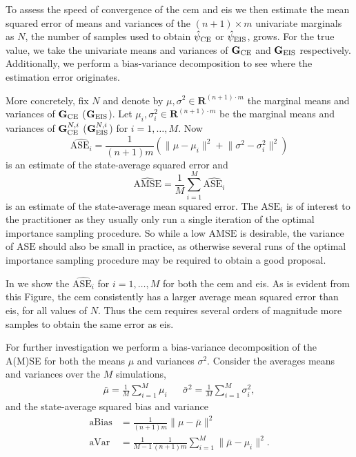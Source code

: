 To assess the speed of convergence of the \gls{cem} and \gls{eis} we then estimate the mean squared error of means and variances of the $(n+1) \times m$ univariate marginals as $N$, the number of samples used to obtain ${\hat\psi_{\text{CE}}}$ or ${\hat\psi_{\text{EIS}}}$, grows. For the true value, we take the univariate means and variances of $\mathbf G_{{\text{CE}}}$ and $\mathbf G_{{\text{EIS}}}$ respectively. Additionally, we perform a bias-variance decomposition to see where the estimation error originates. 

More concretely, fix $N$ and denote by $\mu, \sigma^{2} \in \mathbf R^{(n + 1) \cdot m}$ the marginal means and variances of $\mathbf G_{{\text{CE}}}$ ($\mathbf G_{{\text{EIS}}}$). 
Let $\mu_{i}, \sigma^{2}_{i}\in\mathbf R^{(n + 1) \cdot m}$ be the marginal means and variances of $\mathbf G^{N,i}_{{\text{CE}}}$ ($\mathbf G^{N,i}_{{\text{EIS}}}$) for $i = 1,\dots, M$. 
Now 
$$
\widehat{\text{ASE}_{i}} = \frac{1}{(n +1)m} \left( \lVert \mu - \mu_{i}\rVert^{2} + \lVert \sigma^{2} - \sigma^{2}_{i}\rVert^{2} \right)
$$
is an estimate of the state-average squared error and 
$$
\widehat{\text{AMSE}} = \frac{1}{M} \sum_{i = 1}^{M} \widehat{\text{ASE}_{i}}
$$
is an estimate of the state-average mean squared error. 
The $\text{ASE}_{i}$ is of interest to the practitioner as they usually only run a single iteration of the optimal importance sampling procedure. So while a low $\text{AMSE}$ is desirable, the variance of $\text{ASE}$ should also be small in practice, as otherwise several runs of the optimal importance sampling procedure may be required to obtain a good proposal.

In  we show the $\widehat{\text{ASE}_{i}}$ for $i=1, \dots, M$ for both the \gls{cem} and \gls{eis}. As is evident from this Figure, the \gls{cem} consistently has a larger average mean squared error than \gls{eis}, for all values of $N$. Thus the \gls{cem} requires several orders of magnitude more samples to obtain the same error as \gls{eis}.

For further investigation we perform a bias-variance decomposition of the A(M)SE for both the means $\mu$ and variances $\sigma^{2}$. Consider the averages means and variances over the $M$ simulations,
\begin{align*}
    \bar \mu = \frac{1}{M} \sum_{i=1}^{M} \mu_{i} && \bar \sigma^{2} = \frac{1}{M} \sum_{i=1}^{M} \sigma^{2}_{i},
\end{align*}
and the state-average squared bias and variance
\begin{align*}
    \text{aBias} &= \frac{1}{(n+1)m} \lVert \mu - \bar\mu \rVert^{2} \\
    \text{aVar} &= \frac{1}{M - 1}\frac{1}{(n+1)m} \sum_{i=1}^M \lVert \bar\mu - \mu_{i} \rVert^{2}.
\end{align*}


